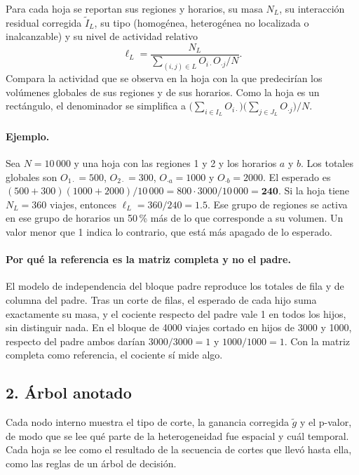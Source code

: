 \documentclass[11pt,a4paper]{article}
\begin{document}
Para cada hoja se reportan sus regiones y horarios, su masa $N_L$, su interacción
residual corregida $\tilde I_L$, su tipo (homogénea, heterogénea no localizada o
inalcanzable) y su nivel de actividad relativo
\[
\ell_L=\frac{N_L}{\sum_{(i,j)\in L}O_{i\cdot}O_{\cdot j}/N}.
\]
Compara la actividad que se observa en la hoja con la que predecirían los volúmenes
globales de sus regiones y de sus horarios. Como la hoja es un rectángulo, el
denominador se simplifica a
$\bigl(\sum_{i\in I_L}O_{i\cdot}\bigr)\bigl(\sum_{j\in J_L}O_{\cdot j}\bigr)/N$.

\paragraph{Ejemplo.} Sea $N=10\,000$ y una hoja con las regiones 1 y 2 y los horarios
$a$ y $b$. Los totales globales son $O_{1\cdot}=500$, $O_{2\cdot}=300$,
$O_{\cdot a}=1000$ y $O_{\cdot b}=2000$. El esperado es
$(500+300)(1000+2000)/10\,000=800\cdot3000/10\,000=\mathbf{240}$. Si la hoja tiene
$N_L=360$ viajes, entonces $\ell_L=360/240=\mathbf{1.5}$. Ese grupo de regiones se
activa en ese grupo de horarios un 50\,\% más de lo que corresponde a su volumen. Un
valor menor que 1 indica lo contrario, que está más apagado de lo esperado.

\paragraph{Por qué la referencia es la matriz completa y no el padre.} El modelo de
independencia del bloque padre reproduce los totales de fila y de columna del padre.
Tras un corte de filas, el esperado de cada hijo suma exactamente su masa, y el
cociente respecto del padre vale 1 en todos los hijos, sin distinguir nada. En el
bloque de 4000 viajes cortado en hijos de 3000 y 1000, respecto del padre ambos
darían $3000/3000=1$ y $1000/1000=1$. Con la matriz completa como referencia, el
cociente sí mide algo.

\subsection{2. Árbol anotado}

Cada nodo interno muestra el tipo de corte, la ganancia corregida $\tilde g$ y el
p-valor, de modo que se lee qué parte de la heterogeneidad fue espacial y cuál
temporal. Cada hoja se lee como el resultado de la secuencia de cortes que llevó hasta
ella, como las reglas de un árbol de decisión.
\end{document}
